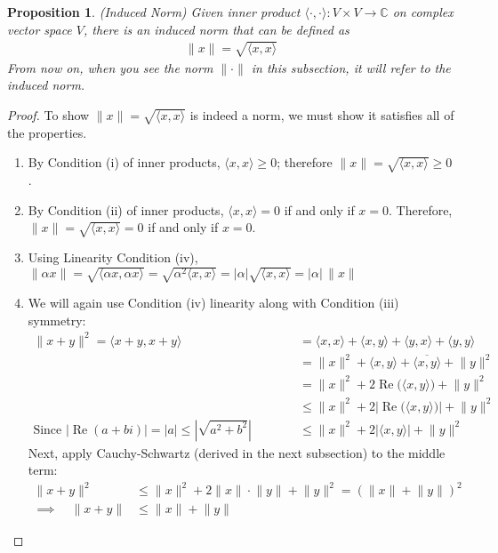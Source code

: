 \documentclass[12pt]{article}
\numberwithin{equation}{section} %
\theoremstyle{plain}
\newtheorem{prop}[thm]{Proposition}
\theoremstyle{definition}
\theoremstyle{remark}
\newcommand{\ra}{\rightarrow}
\newcommand{\C}{\mathbb{C}}
\renewcommand{\Re}{\operatorname{Re}}
\begin{document}
\begin{prop}\emph{(Induced Norm)}
Given inner product $\langle \cdot, \cdot \rangle: V\times V \ra \C$ on
complex vector space $V$, there is an \emph{induced norm} that can be
defined as
\begin{align*}
  \lVert x\rVert = \sqrt{\langle x, x\rangle}
\end{align*}
From now on, when you see the norm $\lVert \cdot \rVert$ in this
subsection, it will refer to the induced norm.
\end{prop}
\begin{proof}
To show $\lVert x \rVert =\sqrt{\langle x,x\rangle}$ is indeed a norm,
we must show it satisfies all of the properties.
\begin{enumerate}[label=(\roman*)]
  \item By Condition (i) of inner products, $\langle x,x \rangle\geq 0$;
    therefore $\lVert x\rVert = \sqrt{\langle x,x \rangle} \geq 0$.
  \item By Condition (ii) of inner products, $\langle x,x \rangle= 0$ if
    and only if $x=0$. Therefore, $\lVert x\rVert = \sqrt{\langle x,x
    \rangle} = 0$ if and only if $x=0$.
  \item Using Linearity Condition (iv),
      $\lVert \alpha x\rVert
      = \sqrt{\langle \alpha x, \alpha x\rangle}
      = \sqrt{\alpha^2\langle x, x \rangle}
      = |\alpha|\sqrt{\langle x, x \rangle}
      = |\alpha|\, \lVert x\rVert$
  \item We will again use Condition (iv) linearity along with Condition
    (iii) symmetry:
    \begin{align*}
      \lVert x+y\rVert^2
      =
      \langle x+y, x+y\rangle
      &=
      \langle x, x\rangle
      +
      \langle x, y\rangle
      +
      \langle y, x\rangle
      +
      \langle y, y\rangle
      \\
      &=
      \lVert x\rVert^2
      +
      \langle x, y\rangle
      +
      \overline{\langle x, y\rangle}
      +
      \lVert y\rVert^2
      \\
      &=
      \lVert x\rVert^2
      +
      2\Re\big( \langle x, y\rangle\big)
      +
      \lVert y\rVert^2
      \\
      &\leq
      \lVert x\rVert^2
      +
      2\left\lvert\Re\big( \langle x, y\rangle\big)\right\rvert
      +
      \lVert y\rVert^2
      \\
      \text{Since $|\Re(a+bi)|=|a| \leq \left\lvert\sqrt{a^2+b^2}\right\rvert$}\qquad\quad
      &\leq
      \lVert x\rVert^2
      +
      2\left\lvert\langle x, y\rangle\right\rvert
      +
      \lVert y\rVert^2
    \end{align*}
    Next, apply Cauchy-Schwartz (derived in the next subsection) to the
    middle term:
    \begin{align*}
      \lVert x+y\rVert^2
      &\leq
      \lVert x\rVert^2
      +
      2\lVert x\rVert\cdot\lVert y\rVert
      +
      \lVert y\rVert^2
      =
      \left(
      \lVert x\rVert
      +
      \lVert y\rVert
      \right)^2
      \\
      \implies\quad
      \lVert x+y\rVert
      &\leq
      \lVert x\rVert
      +
      \lVert y\rVert
    \end{align*}


\end{enumerate}
\end{proof}
\end{document}
